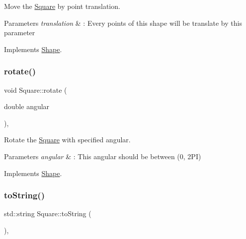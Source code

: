 Move the \hyperlink{classSquare}{Square} by point translation. 


\begin{DoxyParams}{Parameters}
{\em translation} & \+: Every points of this shape will be translate by this parameter \\
\hline
\end{DoxyParams}


Implements \hyperlink{classShape_a52649731b2cb7b67315882d5e005f7e8}{Shape}.

\mbox{\label{classSquare_a5714e182c30f996b78e74e1badd054a2}} 
\subsubsection{\texorpdfstring{rotate()}{rotate()}}
{\footnotesize\ttfamily void Square\+::rotate (\begin{DoxyParamCaption}\item[{double}]{angular }\end{DoxyParamCaption})\hspace{0.3cm}{\ttfamily [override]}, {\ttfamily [virtual]}}



Rotate the \hyperlink{classSquare}{Square} with specified angular. 


\begin{DoxyParams}{Parameters}
{\em angular} & \+: This angular should be between (0, 2\+PI) \\
\hline
\end{DoxyParams}


Implements \hyperlink{classShape_a2dea8616fd40f2d69fd208715921982a}{Shape}.

\mbox{\label{classSquare_aa5d7db8004bba3c400f57513d93b21d4}} 
\subsubsection{\texorpdfstring{to\+String()}{toString()}}
{\footnotesize\ttfamily std\+::string Square\+::to\+String (\begin{DoxyParamCaption}{ }\end{DoxyParamCaption})\hspace{0.3cm}{\ttfamily [override]}, {\ttfamily [virtual]}}



